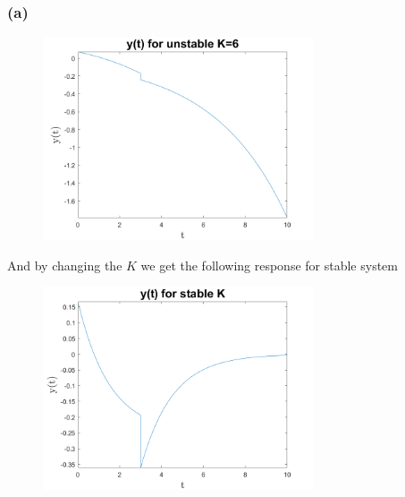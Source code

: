 \documentclass[12pt]{article}
\begin{document}
\subsubsection*{(a)}

\begin{center}
\begin{figure}[h]\includegraphics[width=8cm]{fig4}
\end{figure}
\end{center}
\FloatBarrier
And by changing the $K$ we get the following response for stable system
\begin{center}
\begin{figure}[h]\includegraphics[width=8cm]{fig3}
\end{figure}
\end{center}
\FloatBarrier
\end{document}
